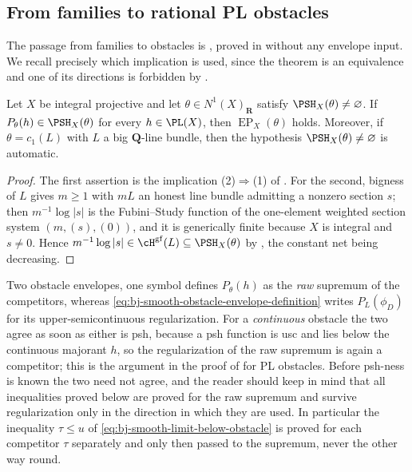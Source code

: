 \subsection{From families to rational PL obstacles}
\label{sec:ch40-families-to-obstacles}

The passage from families to obstacles is ,
proved in  without any envelope input.  We
recall precisely which implication is used, since the theorem is an
equivalence and one of its directions is forbidden by
.

\begin{lemma}
\label{lem:ch40-obstacle-interface}
Let $X$ be integral projective and let $\theta\in N^1(X)_{\mathbf R}$
satisfy $\PSH_X(\theta)\ne\varnothing$.  If
$P_\theta(h)\in\PSH_X(\theta)$ for every $h\in\PL(X)$, then
$\operatorname{EP}_X(\theta)$ holds.  Moreover, if
$\theta=c_1(L)$ with $L$ a big $\mathbf Q$-line bundle, then the
hypothesis $\PSH_X(\theta)\ne\varnothing$ is automatic.
\end{lemma}

\begin{proof}
The first assertion is the implication (2)$\Rightarrow$(1) of
.  For the second, bigness of $L$
gives $m\ge1$ with $mL$ an honest line bundle admitting a nonzero
section $s$; then $m^{-1}\log|s|$ is the Fubini--Study function of the
one-element weighted section system $(m,(s),(0))$, and it is generically
finite because $X$ is integral and $s\ne0$.  Hence
$m^{-1}\log|s|\in\cH^{\mathrm{gf}}(L)\subseteq\PSH_X(\theta)$ by
, the constant net being decreasing.
\end{proof}

\begin{warning}{Two obstacle envelopes, one symbol}
\label{warn:ch40-two-envelopes}
 defines $P_\theta(h)$ as the \emph{raw}
supremum of the competitors, whereas
\eqref{eq:bj-smooth-obstacle-envelope-definition} writes $P_L(\phi_D)$
for its upper-semicontinuous regularization.  For a \emph{continuous}
obstacle the two agree as soon as either is psh, because a psh function is
usc and lies below the continuous majorant $h$, so the regularization of
the raw supremum is again a competitor; this is the argument in the proof of
 for PL obstacles.  Before psh-ness is
known the two need not agree, and the reader should keep in mind that all
inequalities proved below are proved for the raw supremum and survive
regularization only in the direction in which they are used.  In particular
the inequality $\tau\le u$ of \eqref{eq:bj-smooth-limit-below-obstacle} is
proved for each competitor $\tau$ separately and only then passed to the
supremum, never the other way round.
\end{warning}

